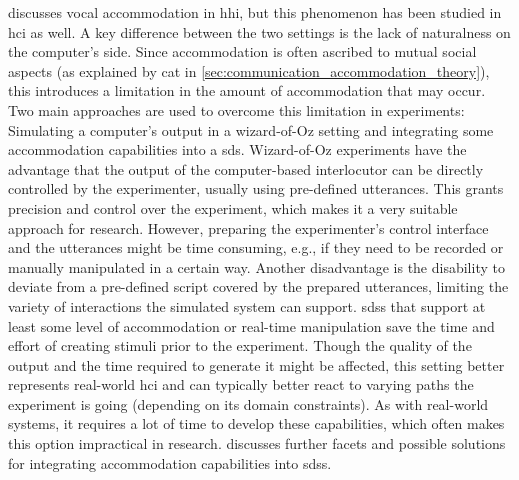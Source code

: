  discusses vocal accommodation in \ac{hhi}, but this phenomenon has been studied in \ac{hci} as well.
A key difference between the two settings is the lack of naturalness on the computer's side. 
Since accommodation is often ascribed to mutual social aspects (as explained by \ac{cat} in \cref{sec:communication_accommodation_theory}), this introduces a limitation in the amount of accommodation that may occur.
Two main approaches are used to overcome this limitation in experiments:
Simulating a computer's output in a wizard-of-Oz setting and integrating some accommodation capabilities into a \ac{sds}.
Wizard-of-Oz experiments have the advantage that the output of the computer-based interlocutor can be directly controlled by the experimenter, usually using pre-defined utterances.
This grants precision and control over the experiment, which makes it a very suitable approach for research.
However, preparing the experimenter's control interface and the utterances might be time consuming, e.g., if they need to be recorded or manually manipulated in a certain way.
Another disadvantage is the disability to deviate from a pre-defined script covered by the prepared utterances, limiting the variety of interactions the simulated system can support.
\Acp{sds} that support at least some level of accommodation or real-time manipulation save the time and effort of creating stimuli prior to the experiment.
Though the quality of the output and the time required to generate it might be affected, this setting better represents real-world \ac{hci} and can typically better react to varying paths the experiment is going (depending on its domain constraints).
As with real-world systems, it requires a lot of time to develop these capabilities, which often makes this option impractical in research.
 discusses further facets and possible solutions for integrating accommodation capabilities into \acp{sds}.

